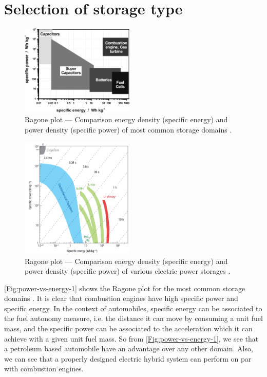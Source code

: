 \documentclass[journal]{IEEEtran}
\begin{document}
\section{Selection of storage type}
\begin{figure}[h]
	\centering
	\includegraphics[width=0.48\textwidth]{specific-power-energy}
	\caption{Ragone plot --- Comparison energy density (specific energy) and power density (specific power) of most common storage domains \cite{winter2004batteries}.}
	\label{Fig:power-vs-energy-1}
\end{figure}

\begin{figure}
	\centering
	\includegraphics[width=0.48\textwidth]{power-vs-energy-density}
	\caption{Ragone plot --- Comparison energy density (specific energy) and power density (specific power) of various electric power storages \cite{simon2008materials}.}
	\label{Fig:power-vs-energy-2}
\end{figure}
\autoref{Fig:power-vs-energy-1} shows the Ragone plot for the most common storage domains \cite{simon2008materials}. It is clear that combustion engines have high specific power and specific energy. In the context of automobiles, specific energy can be associated to the fuel autonomy measure, i.e. the distance it can move by consuming a unit fuel mass, and the specific power can be associated to the acceleration which it can achieve with a given unit fuel mass. So from \autoref{Fig:power-vs-energy-1}, we see that a petroleum based automobile have an advantage over any other domain. Also, we can see that a properly designed electric hybrid system can perform on par with combustion engines.
\end{document}
